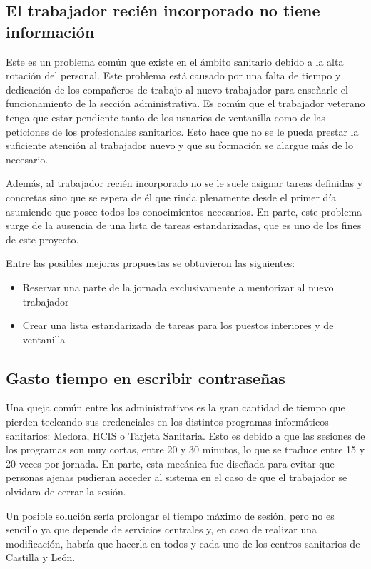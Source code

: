 \subsection{El trabajador recién incorporado no tiene información}

Este es un problema común que existe en el ámbito sanitario debido a la alta rotación del personal.
Este problema está causado por una falta de tiempo y dedicación de los compañeros de trabajo al nuevo trabajador para enseñarle el funcionamiento de la sección administrativa. Es común que el trabajador veterano tenga que estar pendiente tanto de los usuarios de ventanilla como de las peticiones de los profesionales sanitarios. Esto hace que no se le pueda prestar la suficiente atención al trabajador nuevo y que su formación se alargue más de lo necesario.

Además, al trabajador recién incorporado no se le suele asignar tareas definidas y concretas sino que se espera de él que rinda plenamente desde el primer día asumiendo que posee todos los conocimientos necesarios. En parte, este problema surge de la ausencia de una lista de tareas estandarizadas, que es uno de los fines de este proyecto.

Entre las posibles mejoras propuestas se obtuvieron las siguientes:

\begin{itemize}
    \item Reservar una parte de la jornada exclusivamente a mentorizar al nuevo trabajador
    \item Crear una lista estandarizada de tareas para los puestos interiores y de ventanilla
\end{itemize}

\subsection{Gasto tiempo en escribir contraseñas}

Una queja común entre los administrativos es la gran cantidad de tiempo que pierden tecleando sus credenciales en los distintos programas informáticos sanitarios: Medora, HCIS o Tarjeta Sanitaria.
Esto es debido a que las sesiones de los programas son muy cortas, entre 20 y 30 minutos, lo que se traduce entre 15 y 20 veces por jornada.
En parte, esta mecánica fue diseñada para evitar que personas ajenas pudieran acceder al sistema en el caso de que el trabajador se olvidara de cerrar la sesión.

Un posible solución sería prolongar el tiempo máximo de sesión, pero no es sencillo ya que depende de servicios centrales y, en caso de realizar una modificación, habría que hacerla en todos y cada uno de los centros sanitarios de Castilla y León.
